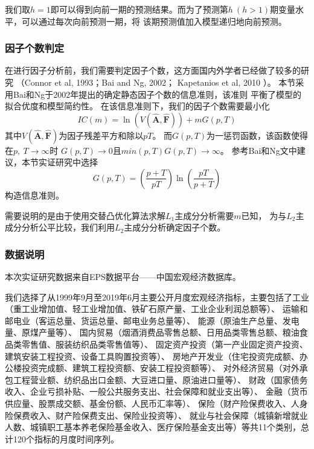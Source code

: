 我们取$h = 1$即可以得到向前一期的预测结果。而为了预测第$h\ (h > 1)$期变量水平，可以通过每次向前预测一期，将
该期预测值加入模型递归地向前预测。

\subsubsection{因子个数判定}
在进行因子分析前，我们需要判定因子个数，这方面国内外学者已经做了较多的研究
（Connor et al, 1993\cite{connor1993test}；Bai and Ng, 2002\cite{bai2002determining}；
Kapetanios et al, 2010\cite{kapetanios2010testing}
）。
本节采用Bai和Ng于2002年提出的确定静态因子个数的信息准则，该准则
平衡了模型的拟合优度和模型简约性。
在该信息准则下，我们的因子个数需要最小化
\begin{equation}\label{number}
    IC(m) = \ln(V(\hat{\bm{A}}, \hat{\bm{F}})) + mG(p, T)
\end{equation}
其中$V(\hat{\bm{A}}, \hat{\bm{F}})$为因子残差平方和除以$pT$。
而$G(p,T)$为一惩罚函数，该函数使得在$p,\ T \rightarrow \infty$时
$G(p, T) \rightarrow 0$且$min(p, T)G(p,T) \rightarrow \infty$。
参考Bai和Ng文中建议，本节实证研究中选择
$$
    G(p, T) = (\frac{p + T}{pT})\ln(\frac{pT}{p + T})
$$
构造信息准则。

需要说明的是由于使用交替凸优化算法求解$L_1$主成分分析需要$m$已知，
为与$L_2$主成分分析公平比较，我们利用$L_2$主成分分析确定因子个数。

\subsubsection{数据说明}
本次实证研究数据来自EPS数据平台——中国宏观经济数据库。

我们选择了从1999年9月至2019年6月主要公开月度宏观经济指标，主要包括了工业（重工业增加值、轻工业增加值、铁矿石原产量、工业企业利润总额等）、
运输和邮电业（客运总量、货运总量、邮电业务总量等）、
能源（原油生产总量、发电量、原煤产量等）、
国内贸易（烟酒消费品零售总额、日用品类零售总额、粮油食品类零售值、服装纺织品类零售值等）、
固定资产投资（第一产业固定资产投资、建筑安装工程投资、设备工具购置投资等）、
房地产开发业（住宅投资完成额、办公楼投资完成额、建筑工程投资额、安装工程投资额等）、
对外经济贸易（对外承包工程营业额、纺织品出口金额、大豆进口量、原油进口量等）、
财政（国家债务收入、企业亏损补贴、一般公共服务支出、社会保障和就业支出等）、
金融（货币供应量、股票成交额、基金份额、人民币汇率等）、
保险（财产险保费收入、人身险保费收入、财产险保费支出、保险业投资等）、
就业与社会保障（城镇新增就业人数、城镇职工基本养老保险基金收入、医疗保险基金支出等）等共11个类别，总计120个指标的月度时间序列。

